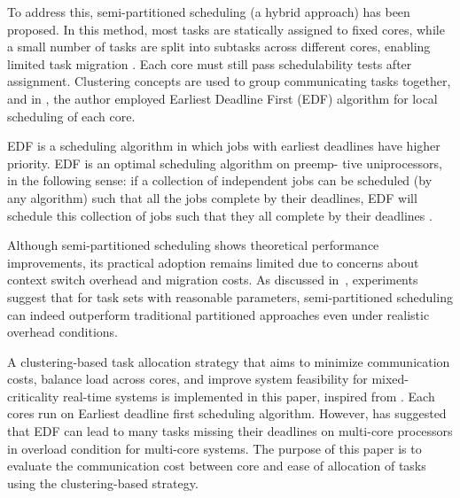 \documentclass[conference]{IEEEtran}
\begin{document}
To address this, semi-partitioned scheduling (a hybrid approach) has been proposed. In this method, most tasks are statically assigned to fixed cores, while a small number of tasks are split into subtasks across different cores, enabling limited task migration \cite{AbdallahGB24}. Each core must still pass schedulability tests after assignment. Clustering concepts are used to group communicating tasks together, and in \cite{AbdallahGB24}, the author employed Earliest Deadline First (EDF) algorithm for local scheduling of each core.

EDF is
a scheduling algorithm in which jobs with earliest deadlines have higher
priority. EDF is an optimal scheduling algorithm on preemp-
tive uniprocessors, in the following sense: if a collection of
independent jobs can be scheduled (by any algorithm) such
that all the jobs complete by their deadlines, EDF will schedule
this collection of jobs such that they all complete by their
deadlines \cite{6122386}.

Although semi-partitioned scheduling shows theoretical performance improvements, its practical adoption remains limited due to concerns about context switch overhead and migration costs. As discussed in~\cite{5953668}, experiments suggest that for task sets with reasonable parameters, semi-partitioned scheduling can indeed outperform traditional partitioned approaches even under realistic overhead conditions.


A clustering-based task allocation strategy that aims to minimize communication costs, balance load across cores, and improve system feasibility for mixed-criticality real-time systems is implemented in this paper, inspired from \cite{AbdallahGB24}. Each cores run on Earliest deadline first scheduling algorithm. However, \cite{5194980} has suggested that EDF can lead to many tasks missing their deadlines on multi-core processors in
overload condition for multi-core systems. The purpose of this paper is to evaluate the communication cost between core and ease of allocation of tasks using the clustering-based strategy. 
\end{document}
